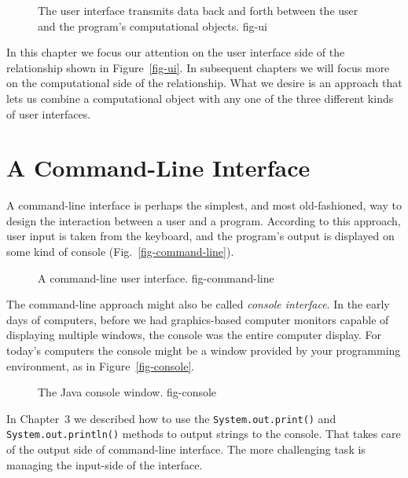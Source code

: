 \begin{figure}[h]
{The user interface transmits data back and forth between the user
and the program's computational objects.
} {fig-ui}

\end{figure}

In this chapter we focus our attention on the user interface side of
the relationship shown in Figure~\ref{fig-ui}. In subsequent chapters
we will focus more on the computational side of the relationship. What
we desire is an approach that lets us combine a computational object
with any one of the three different kinds of user interfaces.


\section{A Command-Line Interface}

A command-line interface is perhaps the simplest, and most
old-fashioned, way to design the interaction between a user and a
program. According to this approach, user input is taken from the
keyboard, and the program's output is displayed on some kind of
console (Fig.~\ref{fig-command-line}).

\begin{figure}[h]
{A command-line user interface.}
{fig-command-line}
\end{figure}

The command-line approach might also be called {\em console
interface}. In the early days of computers, before we had
graphics-based computer monitors capable of displaying multiple
windows, the console was the entire computer display. For today's
computers the console might be a window provided by your programming
environment, as in Figure~\ref{fig-console}.

\begin{figure}[h]
{The Java console window.
} {fig-console}

\end{figure}

In Chapter~3 we described how to use the {\tt System.out.print()} and
{\tt System.out.println()} methods to output strings to the console.
That takes care of the output side of command-line interface. The more
challenging task is managing the input-side of the interface.

